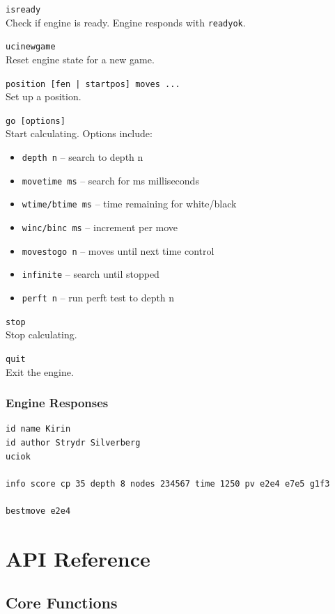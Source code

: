 \documentclass[11pt,a4paper]{report}
\newcommand{\apiendpoint}[3]{%
    \noindent\fbox{\texttt{#1}} \texttt{#2}\\
    #3\vspace{0.5em}
}
\begin{document}
\apiendpoint{IN}{isready}{Check if engine is ready. Engine responds with \texttt{readyok}.}

\apiendpoint{IN}{ucinewgame}{Reset engine state for a new game.}

\apiendpoint{IN}{position [fen | startpos] moves ...}{Set up a position.}

\apiendpoint{IN}{go [options]}{Start calculating. Options include:}
\begin{itemize}[noitemsep]
    \item \texttt{depth n} -- search to depth n
    \item \texttt{movetime ms} -- search for ms milliseconds
    \item \texttt{wtime/btime ms} -- time remaining for white/black
    \item \texttt{winc/binc ms} -- increment per move
    \item \texttt{movestogo n} -- moves until next time control
    \item \texttt{infinite} -- search until stopped
    \item \texttt{perft n} -- run perft test to depth n
\end{itemize}

\apiendpoint{IN}{stop}{Stop calculating.}

\apiendpoint{IN}{quit}{Exit the engine.}

\subsection{Engine Responses}

\begin{lstlisting}
id name Kirin
id author Strydr Silverberg
uciok

info score cp 35 depth 8 nodes 234567 time 1250 pv e2e4 e7e5 g1f3

bestmove e2e4
\end{lstlisting}

\chapter{API Reference}

\section{Core Functions}
\end{document}
